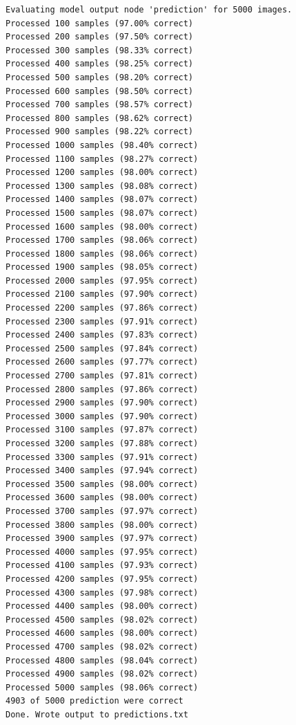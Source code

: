 \documentclass[]{book}
\theoremstyle{definition}
\theoremstyle{definition}
\theoremstyle{definition}
\theoremstyle{remark}
\begin{document}
\begin{verbatim}
Evaluating model output node 'prediction' for 5000 images.
Processed 100 samples (97.00% correct)
Processed 200 samples (97.50% correct)
Processed 300 samples (98.33% correct)
Processed 400 samples (98.25% correct)
Processed 500 samples (98.20% correct)
Processed 600 samples (98.50% correct)
Processed 700 samples (98.57% correct)
Processed 800 samples (98.62% correct)
Processed 900 samples (98.22% correct)
Processed 1000 samples (98.40% correct)
Processed 1100 samples (98.27% correct)
Processed 1200 samples (98.00% correct)
Processed 1300 samples (98.08% correct)
Processed 1400 samples (98.07% correct)
Processed 1500 samples (98.07% correct)
Processed 1600 samples (98.00% correct)
Processed 1700 samples (98.06% correct)
Processed 1800 samples (98.06% correct)
Processed 1900 samples (98.05% correct)
Processed 2000 samples (97.95% correct)
Processed 2100 samples (97.90% correct)
Processed 2200 samples (97.86% correct)
Processed 2300 samples (97.91% correct)
Processed 2400 samples (97.83% correct)
Processed 2500 samples (97.84% correct)
Processed 2600 samples (97.77% correct)
Processed 2700 samples (97.81% correct)
Processed 2800 samples (97.86% correct)
Processed 2900 samples (97.90% correct)
Processed 3000 samples (97.90% correct)
Processed 3100 samples (97.87% correct)
Processed 3200 samples (97.88% correct)
Processed 3300 samples (97.91% correct)
Processed 3400 samples (97.94% correct)
Processed 3500 samples (98.00% correct)
Processed 3600 samples (98.00% correct)
Processed 3700 samples (97.97% correct)
Processed 3800 samples (98.00% correct)
Processed 3900 samples (97.97% correct)
Processed 4000 samples (97.95% correct)
Processed 4100 samples (97.93% correct)
Processed 4200 samples (97.95% correct)
Processed 4300 samples (97.98% correct)
Processed 4400 samples (98.00% correct)
Processed 4500 samples (98.02% correct)
Processed 4600 samples (98.00% correct)
Processed 4700 samples (98.02% correct)
Processed 4800 samples (98.04% correct)
Processed 4900 samples (98.02% correct)
Processed 5000 samples (98.06% correct)
4903 of 5000 prediction were correct
Done. Wrote output to predictions.txt
\end{verbatim}
\end{document}
